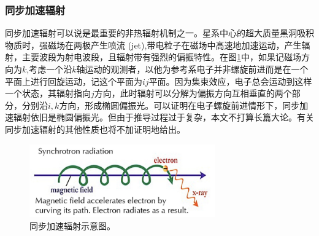 \documentclass[../天体物理基础.tex]{subfiles}
\begin{document}
\subsubsection{同步加速辐射}
同步加速辐射可以说是最重要的非热辐射机制之一。星系中心的超大质量黑洞吸积物质时，强磁场在两极产生喷流 (jet),带电粒子在磁场中高速地加速运动，产生辐射，主要波段为射电波段，且辐射带有强烈的偏振特性。在图\ref{同步加速辐射示意图。}中，如果记磁场方向为$k$,考虑一个沿$k$轴运动的观测者，以他为参考系电子并非螺旋前进而是在一个平面上进行回旋运动，记这个平面为$ij$平面。因为集束效应，电子总会运动到这样一个状态，其辐射指向$j$方向，此时辐射可以分解为偏振方向互相垂直的两个部分，分别沿$i,k$方向，形成椭圆偏振光。可以证明在电子螺旋前进情形下，同步加速辐射依旧是椭圆偏振光。但由于推导过程过于复杂，本文不打算长篇大论。有关同步加速辐射的其他性质也将不加证明地给出。
\begin{figure}[!htbp]
\centering
\includegraphics[width=8cm]{figures/figure1_8.png}
\captionsetup{justification=raggedright, singlelinecheck=false}
\caption{同步加速辐射示意图。}
\label{同步加速辐射示意图。}
\end{figure}
\end{document}
